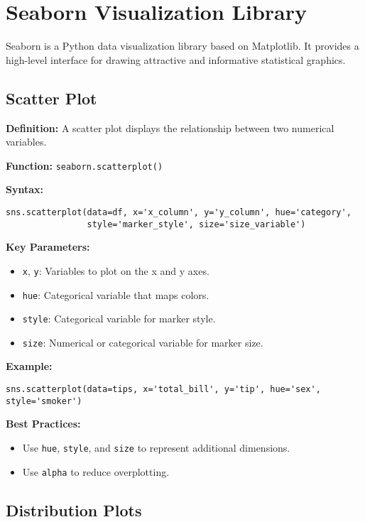 \section{Seaborn Visualization Library}

Seaborn is a Python data visualization library based on Matplotlib. It provides a high-level interface for drawing attractive and informative statistical graphics.

\subsection{Scatter Plot}

\textbf{Definition:} A scatter plot displays the relationship between two numerical variables.

\textbf{Function:} \texttt{seaborn.scatterplot()}

\textbf{Syntax:}
\begin{verbatim}
sns.scatterplot(data=df, x='x_column', y='y_column', hue='category',
                style='marker_style', size='size_variable')
\end{verbatim}

\textbf{Key Parameters:}
\begin{itemize}
    \item \texttt{x}, \texttt{y}: Variables to plot on the x and y axes.
    \item \texttt{hue}: Categorical variable that maps colors.
    \item \texttt{style}: Categorical variable for marker style.
    \item \texttt{size}: Numerical or categorical variable for marker size.
\end{itemize}

\textbf{Example:}
\begin{verbatim}
sns.scatterplot(data=tips, x='total_bill', y='tip', hue='sex', style='smoker')
\end{verbatim}

\textbf{Best Practices:}
\begin{itemize}
    \item Use \texttt{hue}, \texttt{style}, and \texttt{size} to represent additional dimensions.
    \item Use \texttt{alpha} to reduce overplotting.
\end{itemize}

\subsection{Distribution Plots}

